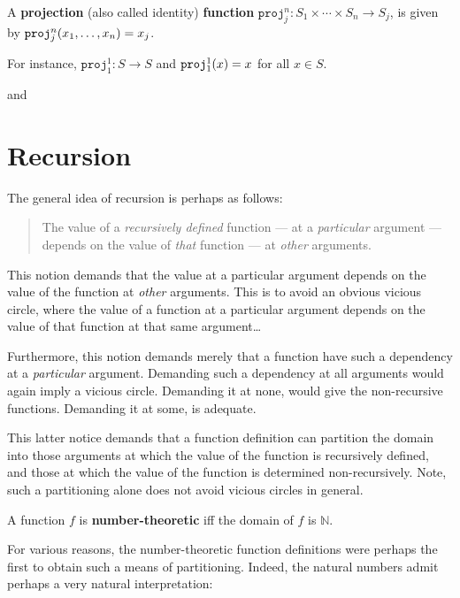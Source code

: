 \begin{definition} A \textbf{projection} (also called identity)
\textbf{function} $\mathtt{proj}^n_j : S_1 \times \cdots \times S_n \rightarrow
S_j$, is given by $\mathtt{proj}^n_j{\mathopen{}\left({x_1,\ldots,x_n}\right)\mathclose{}} = x_j$. \end{definition}

For instance, $\mathtt{proj}^1_1 : S \rightarrow S$ and $\mathtt{proj}^1_1{\mathopen{}\left({x}\right)\mathclose{}}
= x$ for all $x \in S$.

 and 

\section{Recursion}

The general idea of recursion is perhaps as follows:

\begin{quote}

The value of a \emph{recursively defined} function --- at a \emph{particular}
argument --- depends on the value of \emph{that} function --- at \emph{other}
arguments.

\end{quote}

This notion demands that the value at a particular argument depends on the
value of the function at \emph{other} arguments. This is to avoid an obvious
vicious circle, where the value of a function at a particular argument depends
on the value of that function at that same argument\ldots

Furthermore, this notion demands merely that a function have such a dependency
at a \emph{particular} argument. Demanding such a dependency at all arguments
would again imply a vicious circle. Demanding it at none, would give the
non-recursive functions. Demanding it at some, is adequate.

This latter notice demands that a function definition can partition the domain
into those arguments at which the value of the function is recursively defined,
and those at which the value of the function is determined non-recursively.
Note, such a partitioning alone does not avoid vicious circles in general.

\begin{definition} A function $f$ is \textbf{number-theoretic} iff the domain
of $f$ is $\mathbb{N}$. \end{definition}

For various reasons, the number-theoretic function definitions were perhaps the
first to obtain such a means of partitioning. Indeed, the natural numbers admit
perhaps a very natural interpretation:

